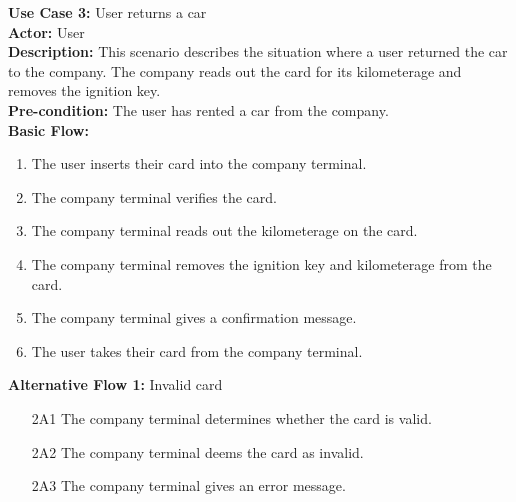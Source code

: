 \documentclass[a4paper]{article}
\begin{document}
\noindent \textbf{Use Case 3:} User returns a car\\
\textbf{Actor:} User\\
\textbf{Description:} This scenario describes the situation where a user returned the car to the company. The company reads out the card for its kilometerage and removes the ignition key.\\
\textbf{Pre-condition:} The user has rented a car from the company.\\
\textbf{Basic Flow:}
\begin{enumerate}
    \item The user inserts their card into the company terminal.
    \item The company terminal verifies the card.
    \item The company terminal reads out the kilometerage on the card.
    \item The company terminal removes the ignition key and kilometerage from the card.
    \item The company terminal gives a confirmation message.
    \item The user takes their card from the company terminal.
\end{enumerate}
\textbf{Alternative Flow 1:} Invalid card
\begin{enumerate}
    \item[2A1] The company terminal determines whether the card is valid.
    \item[2A2] The company terminal deems the card as invalid.
    \item[2A3] The company terminal gives an error message.
\end{enumerate} %

\end{document}
